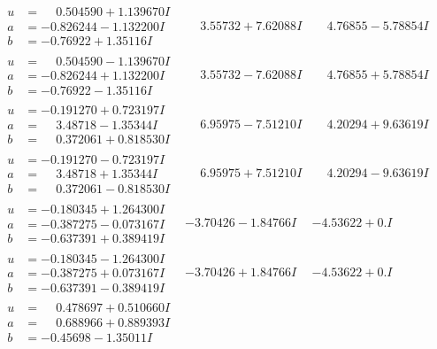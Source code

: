 \documentclass[1p]{elsarticle_modified}
\theoremstyle{definition}
\begin{document}
$$\begin{array}{c|c|c}
\begin{aligned}
u &= \phantom{-}0.504590 + 1.139670 I \\
a &= -0.826244 - 1.132200 I \\
b &= -0.76922 + 1.35116 I\end{aligned}
 & \phantom{-}3.55732 + 7.62088 I & \phantom{-}4.76855 - 5.78854 I \\ \hline\begin{aligned}
u &= \phantom{-}0.504590 - 1.139670 I \\
a &= -0.826244 + 1.132200 I \\
b &= -0.76922 - 1.35116 I\end{aligned}
 & \phantom{-}3.55732 - 7.62088 I & \phantom{-}4.76855 + 5.78854 I \\ \hline\begin{aligned}
u &= -0.191270 + 0.723197 I \\
a &= \phantom{-}3.48718 - 1.35344 I \\
b &= \phantom{-}0.372061 + 0.818530 I\end{aligned}
 & \phantom{-}6.95975 - 7.51210 I & \phantom{-}4.20294 + 9.63619 I \\ \hline\begin{aligned}
u &= -0.191270 - 0.723197 I \\
a &= \phantom{-}3.48718 + 1.35344 I \\
b &= \phantom{-}0.372061 - 0.818530 I\end{aligned}
 & \phantom{-}6.95975 + 7.51210 I & \phantom{-}4.20294 - 9.63619 I \\ \hline\begin{aligned}
u &= -0.180345 + 1.264300 I \\
a &= -0.387275 - 0.073167 I \\
b &= -0.637391 + 0.389419 I\end{aligned}
 & -3.70426 - 1.84766 I & -4.53622 + 0. I\phantom{ +0.000000I} \\ \hline\begin{aligned}
u &= -0.180345 - 1.264300 I \\
a &= -0.387275 + 0.073167 I \\
b &= -0.637391 - 0.389419 I\end{aligned}
 & -3.70426 + 1.84766 I & -4.53622 + 0. I\phantom{ +0.000000I} \\ \hline\begin{aligned}
u &= \phantom{-}0.478697 + 0.510660 I \\
a &= \phantom{-}0.688966 + 0.889393 I \\
b &= -0.45698 - 1.35011 I\end{aligned}

\end{array}$$
\end{document}
